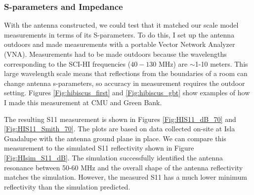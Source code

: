 \subsubsection{S-parameters and Impedance}\label{Sec:HIbiscus_Imp}

With the antenna constructed, we could test that it matched our scale model measurements in terms of its S-parameters. To do this, I set up the antenna outdoors and made measurements with a portable Vector Network Analyzer (VNA). Measurements had to be made outdoors because the wavelengths corresponding to the SCI-HI frequencies ($40-130$ MHz) are $\sim$1-10 meters. This large wavelength scale means that reflections from the boundaries of a room can change antenna s-parameters, so accuracy in measurement requires the outdoor setting. Figures \ref{Fig:hibiscus_first} and \ref{Fig:hibiscus_gbt} show examples of how I made this measurement at CMU and Green Bank.

The resulting S11 measurement is shown in Figures \ref{Fig:HIS11_dB_70} and \ref{Fig:HIS11_Smith_70}. The plots are based on data collected on-site at Isla Guadalupe with the antenna ground plane in place. We can compare this measurement to the simulated S11 reflectivity shown in Figure \ref{Fig:HIsim_S11_dB}. The simulation successfully identified the antenna resonance between 50-60 MHz and the overall shape of the antenna reflectivity matches the simulation. However, the measured S11 has a much lower minimum reflectivity than the simulation predicted. 

